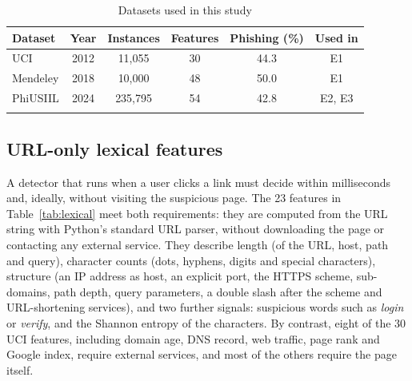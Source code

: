 \documentclass[pdflatex,sn-mathphys-num]{sn-jnl}%
\theoremstyle{thmstyleone}%
\theoremstyle{thmstyletwo}%
\theoremstyle{thmstylethree}%
\begin{document}
\begin{table}[htbp]
\caption{Datasets used in this study}\label{tab:datasets}%
\begin{tabular}{@{}lccccc@{}}
\toprule
Dataset & Year & Instances & Features & Phishing (\%) & Used in\\
\midrule
UCI \cite{mohammad2012uci} & 2012 & 11,055 & 30 & 44.3 & E1 \\
Mendeley \cite{tan2018} & 2018 & 10,000 & 48 & 50.0 & E1\footnotemark[1] \\
PhiUSIIL \cite{prasad2024,prasad2024data} & 2024 & 235,795 & 54\footnotemark[2] & 42.8 & E2, E3 \\
\botrule
\end{tabular}
\end{table}

\subsection{URL-only lexical features}\label{subsec3-4}

A detector that runs when a user clicks a link must decide within milliseconds and, ideally, without visiting the suspicious page. The 23 features in Table~\ref{tab:lexical} meet both requirements: they are computed from the URL string with Python's standard URL parser, without downloading the page or contacting any external service. They describe length (of the URL, host, path and query), character counts (dots, hyphens, digits and special characters), structure (an IP address as host, an explicit port, the HTTPS scheme, sub-domains, path depth, query parameters, a double slash after the scheme and URL-shortening services), and two further signals: suspicious words such as \emph{login} or \emph{verify}, and the Shannon entropy of the characters. By contrast, eight of the 30 UCI features, including domain age, DNS record, web traffic, page rank and Google index, require external services, and most of the others require the page itself.
\end{document}
